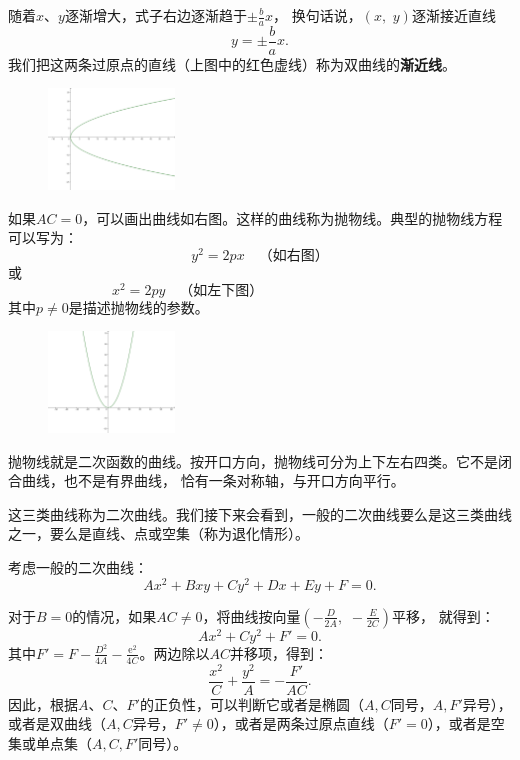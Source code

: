 \documentclass[12pt,UTF8]{ctexbook}
\newcommand{\e}{\mathrm{e}}
\theoremstyle{definition}
\theoremstyle{plain}
\begin{document}
随着$x$、$y$逐渐增大，式子右边逐渐趋于$\displaystyle\pm \frac{b}{a} x$，
换句话说，$(x, \,\, y)$逐渐接近直线
$$ y = \pm \frac{b}{a}x. $$
我们把这两条过原点的直线（上图中的红色虚线）称为双曲线的\textbf{渐近线}。

\begin{figure} %
    \flushright
    \includegraphics[width=0.3\textwidth]{tu/抛物线1.png}
\end{figure}

如果$AC = 0$，可以画出曲线如右图。这样的曲线称为抛物线。典型的抛物线方程可以写为：
$$ y^2 = 2px  \quad \mbox{（如右图）} $$
或
$$ x^2 = 2py  \quad \mbox{（如左下图）} \qquad  \qquad  \qquad  \qquad\;\;\; \phantom{123}$$
其中$p \neq 0$是描述抛物线的参数。

\begin{figure} %
    \vspace{-30pt}
    \flushright
    \includegraphics[width=0.3\textwidth]{tu/抛物线2.png}
\end{figure}

抛物线就是二次函数的曲线。按开口方向，抛物线可分为上下左右四类。它不是闭合曲线，也不是有界曲线，
恰有一条对称轴，与开口方向平行。

这三类曲线称为二次曲线。我们接下来会看到，一般的二次曲线要么是这三类曲线之一，要么是直线、点或空集（称为退化情形）。

考虑一般的二次曲线：
$$ Ax^2 + Bxy + Cy^2 + Dx + Ey + F = 0.$$

对于$B = 0$的情况，如果$AC\neq 0$，将曲线按向量$\displaystyle\left(-\frac{D}{2A},\,\,-\frac{E}{2C}\right)$平移，
就得到：
$$ Ax^2 + Cy^2 + F' = 0.$$
其中$F' = F - \frac{D^2}{4A} - \frac{\e^2}{4C}$。两边除以$AC$并移项，得到：
$$ \frac{x^2}{C} + \frac{y^2}{A} = -\frac{F'}{AC}.$$
因此，根据$A$、$C$、$F'$的正负性，可以判断它或者是椭圆（$A,C$同号，$A,F'$异号），
或者是双曲线（$A,C$异号，$F' \neq 0$），或者是两条过原点直线（$F' = 0$），或者是空集或单点集（$A,C,F'$同号）。
\end{document}
